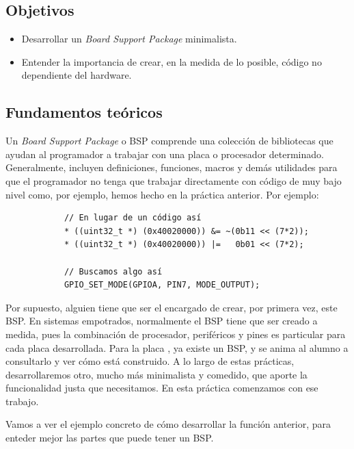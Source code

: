 \documentclass[../main.tex]{subfiles}
\begin{document}

    \subsection{Objetivos}
        \begin{itemize}
            \item Desarrollar un \textit{Board Support Package} minimalista.
            \item Entender la importancia de crear, en la medida de lo posible, código no dependiente del hardware.
        \end{itemize}

    \subsection{Fundamentos teóricos}
       
        Un \textit{Board Support Package} o BSP comprende una colección de bibliotecas que ayudan al programador a trabajar con una placa o procesador determinado. Generalmente, incluyen definiciones, funciones, macros y demás utilidades para que el programador no tenga que trabajar directamente con código de muy bajo nivel como, por ejemplo, hemos hecho en la práctica anterior. Por ejemplo:

        \begin{lstlisting}
            // En lugar de un código así
            * ((uint32_t *) (0x40020000)) &= ~(0b11 << (7*2));
            * ((uint32_t *) (0x40020000)) |=   0b01 << (7*2);

            // Buscamos algo así
            GPIO_SET_MODE(GPIOA, PIN7, MODE_OUTPUT);
        \end{lstlisting}

        Por supuesto, alguien tiene que ser el encargado de crear, por primera vez, este BSP. En sistemas empotrados, normalmente el BSP tiene que ser creado a medida, pues la combinación de procesador, periféricos y pines es particular para cada placa desarrollada. Para la placa \BOARD, ya existe un BSP, y se anima al alumno a consultarlo y ver cómo está construido. A lo largo de estas prácticas, desarrollaremos otro, mucho más minimalista y comedido, que aporte la funcionalidad justa que necesitamos. En esta práctica comenzamos con ese trabajo.

        Vamos a ver el ejemplo concreto de cómo desarrollar la función anterior, para enteder mejor las partes que puede tener un BSP. 
\end{document}
